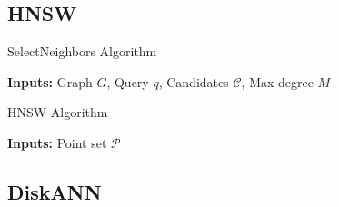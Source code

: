 \subsection{HNSW}

\begin{frame}
\begin{algorithm}[H]
    \caption{SelectNeighbors Algorithm}\label{alg:select-nbrs}
    \begin{algorithmic}[1]
             
                \EndIf
            \EndWhile
        \EndFunction
    \end{algorithmic}
\end{algorithm}

\textbf{Inputs:} Graph \(G\), Query \(q\), Candidates \(\mathcal{C}\), Max degree \(M\)
\end{frame}

\begin{frame}
\begin{algorithm}[H]
    \caption{HNSW Algorithm}\label{alg:hnsw}
    \begin{algorithmic}[1]
            \EndFor
        \EndFunction
    \end{algorithmic}
\end{algorithm}

\textbf{Inputs:} Point set \(\mathcal{P}\)
\end{frame}

\subsection{DiskANN}


